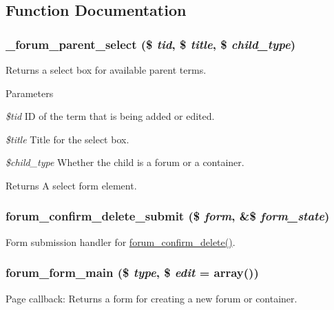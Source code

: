 \subsection{Function Documentation}
\hypertarget{forum_8admin_8inc_ab33107c6a704c306d24ed1ea5dd8dc35}{
\subsubsection[{\_\-forum\_\-parent\_\-select}]{\setlength{\rightskip}{0pt plus 5cm}\_\-forum\_\-parent\_\-select (\$ {\em tid}, \/  \$ {\em title}, \/  \$ {\em child\_\-type})}}
\label{forum_8admin_8inc_ab33107c6a704c306d24ed1ea5dd8dc35}
Returns a select box for available parent terms.


\begin{DoxyParams}{Parameters}
\item[{\em \$tid}]ID of the term that is being added or edited. \item[{\em \$title}]Title for the select box. \item[{\em \$child\_\-type}]Whether the child is a forum or a container.\end{DoxyParams}
\begin{DoxyReturn}{Returns}
A select form element. 
\end{DoxyReturn}
\hypertarget{forum_8admin_8inc_aef93d685b6f28845e233fc1f697c05ab}{
\subsubsection[{forum\_\-confirm\_\-delete\_\-submit}]{\setlength{\rightskip}{0pt plus 5cm}forum\_\-confirm\_\-delete\_\-submit (\$ {\em form}, \/  \&\$ {\em form\_\-state})}}
\label{forum_8admin_8inc_aef93d685b6f28845e233fc1f697c05ab}
Form submission handler for \hyperlink{group__forms_ga2e160e8a91338ff16883e27d806eb63e}{forum\_\-confirm\_\-delete()}. \hypertarget{forum_8admin_8inc_aac7be1aa9e7ee3f1ff6a495c0c68b5de}{
\subsubsection[{forum\_\-form\_\-main}]{\setlength{\rightskip}{0pt plus 5cm}forum\_\-form\_\-main (\$ {\em type}, \/  \$ {\em edit} = {\ttfamily array()})}}
\label{forum_8admin_8inc_aac7be1aa9e7ee3f1ff6a495c0c68b5de}
Page callback: Returns a form for creating a new forum or container.


